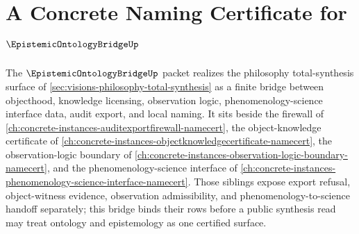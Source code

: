 \chapter{A Concrete Naming Certificate for $\EpistemicOntologyBridgeUp$}
\label{ch:concrete-instances-epistemicontologybridge-namecert}

The $\EpistemicOntologyBridgeUp$ packet realizes the philosophy total-synthesis surface of \autoref{sec:visions-philosophy-total-synthesis} as a finite bridge between objecthood, knowledge licensing, observation logic, phenomenology-science interface data, audit export, and local naming. It sits beside the firewall of \autoref{ch:concrete-instances-auditexportfirewall-namecert}, the object-knowledge certificate of \autoref{ch:concrete-instances-objectknowledgecertificate-namecert}, the observation-logic boundary of \autoref{ch:concrete-instances-observation-logic-boundary-namecert}, and the phenomenology-science interface of \autoref{ch:concrete-instances-phenomenology-science-interface-namecert}. Those siblings expose export refusal, object-witness evidence, observation admissibility, and phenomenology-to-science handoff separately; this bridge binds their rows before a public synthesis read may treat ontology and epistemology as one certified surface.

